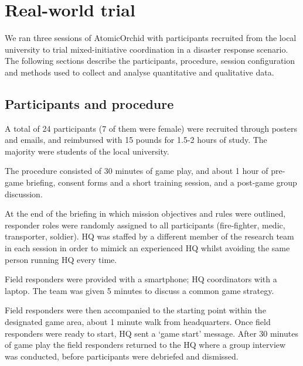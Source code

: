  




\section{Real-world trial}
We ran three sessions of AtomicOrchid with participants recruited from the local university to trial mixed-initiative coordination in a disaster response scenario. The following sections describe the participants, procedure, session configuration and methods used to collect and analyse quantitative and qualitative data.

\subsection{Participants and procedure}
A total of 24 participants (7 of them were female) were recruited through posters and emails, and reimbursed with 15 pounds for 1.5-2 hours of study. The majority were students of the local university.

The procedure consisted of 30 minutes of game play, and about 1 hour of pre-game briefing, consent forms and a short training session, and a post-game group discussion. 


At the end of the briefing in which mission objectives and rules were outlined, responder roles were randomly assigned to all participants (fire-fighter, medic, transporter, soldier). HQ was staffed by a different member of the research team in each session in order to mimick an experienced HQ whilst avoiding the same person running HQ every time. 

Field responders were provided with a smartphone; HQ coordinators with a laptop. The team was given 5 minutes to discuss a common game strategy. 


Field responders were then accompanied to the starting point within the designated game area, about 1 minute walk from headquarters. Once field responders were ready to start, HQ sent a `game start' message. After 30 minutes of game play the field responders returned to the HQ where a group interview was conducted, before participants were debriefed and dismissed.

